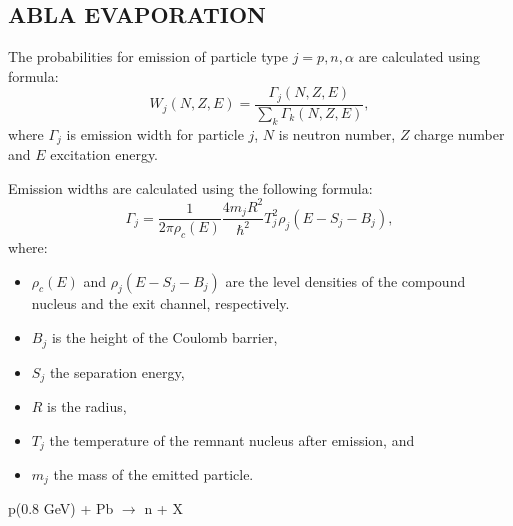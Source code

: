 \documentclass[20pt]{article}
\newenvironment{textbox}
{\begin{lrbox}{\dummybox}\begin{minipage}{0.9\columnwidth}}
{\end{minipage}\end{lrbox}\raisebox{-\depth}{\psshadowbox[framesep=1em,framearc=.1,shadow=true]{\usebox{\dummybox}}}\vspace{0.005\textheight}}
\begin{document}
\begin{center}
\begin{multicols}{3}
\begin{textbox}


\section*{{\Huge {\sf ABLA EVAPORATION}}}
The probabilities for emission of particle type $j = {p, n, \alpha}$
are calculated using formula:
\begin{equation}
W_j(N,Z,E) = \frac{\Gamma_j(N,Z,E)}{\sum_k\Gamma_k(N,Z,E)},
\label{eqn:probabilities}
\end{equation}
where $\Gamma_j$ is emission width for particle $j$, $N$ is neutron
number, $Z$ charge number and $E$ excitation energy.
\vskip0.5cm

Emission widths are calculated using the following formula:
\begin{equation}
\Gamma_j = \frac{1}{2 \pi \rho_c(E)} \frac{4 m_j R^2}{\hbar^2} T_j^2 \rho_j(E - S_j - B_j),
\label{eqn:emissionwidth}
\end{equation}
where:
\begin{itemize}
\item $\rho_c(E)$ and $\rho_j(E - S_j - B_j)$ are the level densities
of the compound nucleus and the exit channel, respectively.
\item $B_j$ is the height of the Coulomb barrier,
\item $S_j$ the separation energy,
\item $R$ is the radius,
\item $T_j$ the temperature of the remnant nucleus after
emission, and
\item $m_j$ the mass of the emitted particle.
\end{itemize}
\end{textbox}

{\Huge {\sf p(0.8 GeV) + Pb $\rightarrow$ n + X}}


\end{multicols}
\end{center}
\end{document}
